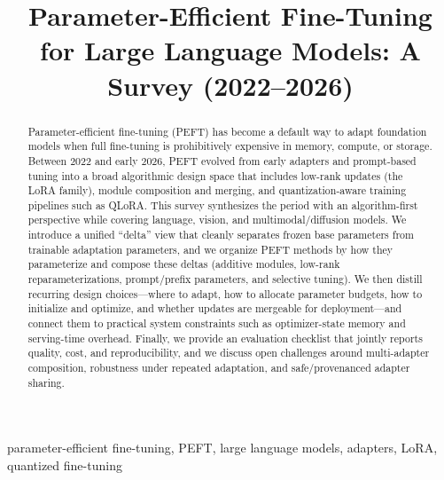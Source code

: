 \documentclass[conference]{IEEEtran}
\begin{document}
\title{Parameter-Efficient Fine-Tuning for Large Language Models: A Survey (2022--2026)}

\author{
}

\maketitle

\begin{IEEEkeywords}
parameter-efficient fine-tuning, PEFT, large language models, adapters, LoRA, quantized fine-tuning
\end{IEEEkeywords}

\begin{abstract}
Parameter-efficient fine-tuning (PEFT) has become a default way to adapt foundation models when full fine-tuning is prohibitively expensive in memory, compute, or storage. Between 2022 and early 2026, PEFT evolved from early adapters and prompt-based tuning into a broad algorithmic design space that includes low-rank updates (the LoRA family), module composition and merging, and quantization-aware training pipelines such as QLoRA. This survey synthesizes the period with an algorithm-first perspective while covering language, vision, and multimodal/diffusion models. We introduce a unified ``delta'' view that cleanly separates frozen base parameters from trainable adaptation parameters, and we organize PEFT methods by how they parameterize and compose these deltas (additive modules, low-rank reparameterizations, prompt/prefix parameters, and selective tuning). We then distill recurring design choices---where to adapt, how to allocate parameter budgets, how to initialize and optimize, and whether updates are mergeable for deployment---and connect them to practical system constraints such as optimizer-state memory and serving-time overhead. Finally, we provide an evaluation checklist that jointly reports quality, cost, and reproducibility, and we discuss open challenges around multi-adapter composition, robustness under repeated adaptation, and safe/provenanced adapter sharing.
\end{abstract}
\end{document}
